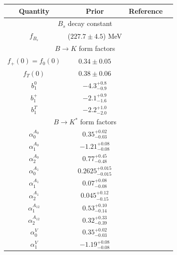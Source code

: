 \documentclass[twocolumn,epjc3]{svjour3}
\numberwithin{equation}{section}
\renewcommand{\[}{\big[}
\renewcommand{\]}{\big]}
\renewcommand{\(}{\big(}
\renewcommand{\)}{\big)}
\begin{document}
\begin{table}
\begin{center}
\renewcommand{\arraystretch}{1.4}
\begin{tabular}{cccc}
\hline
  Quantity & Prior & Reference\\
\hline
  \multicolumn{3}{c}{$B_s$ decay constant}
\\
\hline
  $f_{B_s}$   &  ($227.7 \pm 4.5$) MeV &  \cite{Aoki:2013ldr}\\
\hline
  \multicolumn{3}{c}{$B\to K$ form factors}\\
\hline
  $f_+(0)=f_0(0)$    &  $0.34 \pm 0.05$       &  \cite{Khodjamirian:2010vf, Ball:2004ye}\\
  $f_T(0)$    &  $0.38 \pm 0.06$      &  \cite{Khodjamirian:2010vf, Ball:2004ye}\\
  $b_1^0$     &  $-4.3^{+0.8}_{-0.9}$    &  \cite{Khodjamirian:2010vf}\\
  $b_1^+$     &  $-2.1^{+0.9}_{-1.6}$    &  \cite{Khodjamirian:2010vf}\\
  $b_1^T$     &  $-2.2^{+1.0}_{-2.0}$    &  \cite{Khodjamirian:2010vf}\\
\hline
\multicolumn{3}{c}{$B\to K^*$ form factors}\\
\hline
$\alpha_{0}^{A_0}$     & $0.35^{+0.02}_{-0.03}$      & \cite{Straub:2015ica, Horgan:2015vla}\\
$\alpha_{1}^{A_0}$     & $-1.21^{+0.08}_{-0.08}$     & \cite{Straub:2015ica, Horgan:2015vla}\\
$\alpha_{2}^{A_0}$     & $0.77^{+0.45}_{-0.48}$      & \cite{Straub:2015ica, Horgan:2015vla}\\
$\alpha_{0}^{A_1}$     & $0.2625^{+0.015}_{-0.015}$  & \cite{Straub:2015ica, Horgan:2015vla}\\
$\alpha_{1}^{A_1}$     & $0.07^{+0.08}_{-0.08}$      & \cite{Straub:2015ica, Horgan:2015vla}\\
$\alpha_{2}^{A_1}$     & $0.045^{+0.12}_{-0.15}$     & \cite{Straub:2015ica, Horgan:2015vla}\\
$\alpha_{1}^{A_{12}}$  & $0.53^{+0.10}_{-0.14}$     & \cite{Straub:2015ica, Horgan:2015vla}\\
$\alpha_{2}^{A_{12}}$  & $0.32^{+0.33}_{-0.39}$      & \cite{Straub:2015ica, Horgan:2015vla}\\
$\alpha_{0}^{V}$       & $0.35^{+0.02}_{-0.03}$      & \cite{Straub:2015ica, Horgan:2015vla}\\
$\alpha_{1}^{V}$       & $-1.19^{+0.08}_{-0.08}$     & \cite{Straub:2015ica, Horgan:2015vla}\\

\end{tabular}
\end{center}
\end{table}
\end{document}
